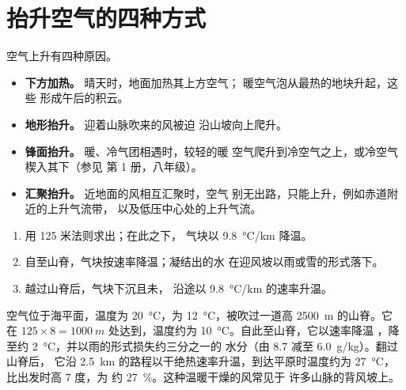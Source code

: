 \section{抬升空气的四种方式}

空气上升有四种原因。
\begin{itemize}
  \item \textbf{下方加热。} 晴天时，地面加热其上方空气；
        暖空气泡从最热的地块升起，这些
        形成午后的积云。
  \item \textbf{地形抬升。} 迎着山脉吹来的风被迫
        沿山坡向上爬升。
  \item \textbf{锋面抬升。} 暖、冷气团相遇时，较轻的暖
        空气爬升到冷空气之上，或冷空气楔入其下（参见
        第 1 册，八年级）。
  \item \textbf{汇聚抬升。} 近地面的风相互汇聚时，空气
        别无出路，只能上升，例如赤道附近的上升气流带，
        以及低压中心处的上升气流。
\end{itemize}

\begin{method}[跟踪气块越过山脉]\label{met:g10:why-clouds-form:mountain}
\begin{enumerate}
  \item 用 125 米法则求出；在此之下，
        气块以 \qty{9.8}{\degreeCelsius/km} 降温。
  \item 自至山脊，气块按速率降温；凝结出的水
        在迎风坡以雨或雪的形式落下。
  \item 越过山脊后，气块下沉且未，
        沿途以 \qty{9.8}{\degreeCelsius/km} 的速率升温。
\end{enumerate}
\end{method}

\begin{example}[背风坡的暖干风]\label{ex:g10:why-clouds-form:lee}
空气位于海平面，温度为 \qty{20}{\degreeCelsius}，为
\qty{12}{\degreeCelsius}，被吹过一道高 \qty{2500}{m} 的山脊。它
在 $125 \times 8 = \qty{1000}{m}$ 处达到，温度约为
\qty{10}{\degreeCelsius}。自此至山脊，它以速率降温
，降至约 \qty{2}{\degreeCelsius}，并以雨的形式损失约三分之一的
水分（由 \num{8.7} 减至 \qty{6.0}{g/kg}）。翻过山脊后，
它沿 \qty{2.5}{km} 的路程以干绝热速率升温，到达平原时温度约为
\qty{27}{\degreeCelsius}，比出发时高 7 度，为
约 \qty{27}{\percent}。这种温暖干燥的风常见于
许多山脉的背风坡上。
\end{example}

